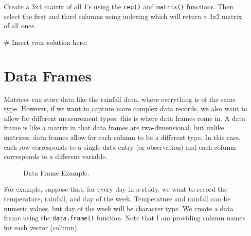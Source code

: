 \documentclass[
  letterpaper,
]{krantz}
\makeatletter
\newenvironment{Shaded}{\begin{snugshade}}{\end{snugshade}}
\newcommand{\CommentTok}[1]{\textcolor[rgb]{0.37,0.37,0.37}{#1}}
\newenvironment{kframe}{%
\medskip{}
\setlength{\fboxsep}{.8em}
 \def\at@end@of@kframe{}%
 \ifinner\ifhmode%
  \def\at@end@of@kframe{\end{minipage}}%
  \begin{minipage}{\columnwidth}%
 \fi\fi%
 \def\FrameCommand##1{\hskip\@totalleftmargin \hskip-\fboxsep
 \colorbox{shadecolor}{##1}\hskip-\fboxsep
     \hskip-\linewidth \hskip-\@totalleftmargin \hskip\columnwidth}%
 \MakeFramed {\advance\hsize-\width
   \@totalleftmargin\z@ \linewidth\hsize
   \@setminipage}}%
 {\par\unskip\endMakeFramed%
 \at@end@of@kframe}
\renewenvironment{Shaded}{\begin{kframe}}{\end{kframe}}
\makeatother
\begin{document}
Create a 3x4 matrix of all 1's using the \texttt{rep()} and
\texttt{matrix()} functions. Then select the first and third columns
using indexing which will return a 3x2 matrix of all ones.

\begin{Shaded}
\begin{Highlighting}[]
\CommentTok{\# Insert your solution here:}
\end{Highlighting}
\end{Shaded}

\section{Data Frames}\label{data-frames}

Matrices can store data like the rainfall data, where everything is of
the same type. However, if we want to capture more complex data records,
we also want to allow for different measurement types: this is where
data frames come in. A data frame is like a matrix in that data frames
are two-dimensional, but unlike matrices, data frames allow for each
column to be a different type. In this case, each row corresponds to a
single data entry (or observation) and each column corresponds to a
different variable.

\begin{figure}


\caption{\label{fig-dataframe}Data Frame Example.}

\end{figure}%

For example, suppose that, for every day in a study, we want to record
the temperature, rainfall, and day of the week. Temperature and rainfall
can be numeric values, but day of the week will be character type. We
create a data frame using the \texttt{data.frame()} function. Note that
I am providing column names for each vector (column).
\end{document}
